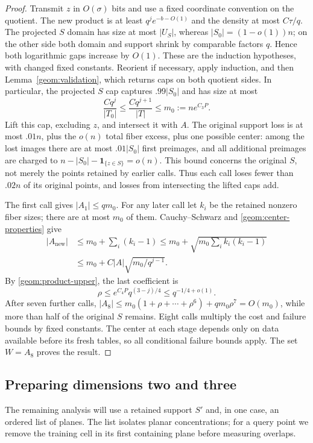 \begin{proof}
Transmit $z$ in $O(\sigma)$ bits and use a fixed coordinate convention
on the quotient. The new product is at least $q^je^{-b-O(1)}$ and the
density at most $C\tau/q$. The projected $S$ domain has size at most
$|U_S|$, whereas $|S_0|=(1-o(1))n$; on the other side both domain and
support shrink by comparable factors $q$. Hence both logarithmic gaps
increase by $O(1)$. These are the induction hypotheses, with changed
fixed constants. Reorient if necessary, apply induction, and then
Lemma~\ref{geom:validation}, which returns caps on both quotient
sides. In particular, the projected $S$ cap captures $.99|S_0|$ and
has size at most
\[
 \frac{Cq^j}{|T_0|}\leq \frac{Cq^{j+1}}{|T|}
 \leq m_0:=ne^{C_3P}.
\]
Lift this cap, excluding $z$, and intersect it with $A$.
The original support loss is at most $.01n$, plus the $o(n)$ total
fiber excess, plus one possible center: among the lost images there
are at most $.01|S_0|$ first preimages, and all additional preimages
are charged to $n-|S_0|-\boldsymbol 1_{\{z\in S\}}=o(n)$.
This bound concerns the original $S$, not merely the points retained
by earlier calls. Thus each call loses fewer than $.02n$ of its
original points, and losses from intersecting the lifted caps add.

The first call gives $|A_1|\leq qm_0$. For any later call let $k_i$
be the retained nonzero fiber sizes; there are at most $m_0$ of them.
Cauchy--Schwarz and \eqref{geom:center-properties} give
\[
 \begin{split}
 |A_{\mathrm{new}}|
 &\leq m_0+\sum_i(k_i-1)
 \leq m_0+\sqrt{m_0\sum_i k_i(k_i-1)}\\
 &\leq m_0+C|A|\sqrt{m_0/q^{j-1}}.
 \end{split}
\]
By \eqref{geom:product-upper}, the last coefficient is
\[
 \rho\leq e^{C_4P}q^{(3-j)/4}\leq q^{-1/4+o(1)}.
\]
After seven further calls,
$|A_8|\leq m_0(1+\rho+\cdots+\rho^6)+qm_0\rho^7=O(m_0)$,
while more than half of the original $S$ remains. Eight calls multiply
the cost and failure bounds by fixed constants. The center at each
stage depends only on data available before its fresh tables, so all
conditional failure bounds apply. The set $W=A_8$ proves the result.
\end{proof}

\subsection{Preparing dimensions two and three}

The remaining analysis will use a retained support $S'$ and, in one
case, an ordered list of planes. The list isolates planar concentrations;
for a query point we remove the training cell in its first containing
plane before measuring overlaps.


